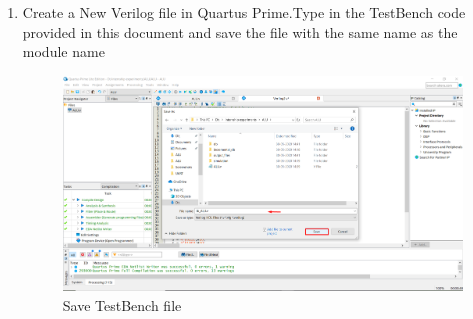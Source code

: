 \documentclass[12pt,singleside,a4paper]{article}
\begin{document}
 \begin{enumerate}
     \item Create a New Verilog file in Quartus Prime.Type in the TestBench code provided in this document and save the file with the same name as the module name
    \begin{figure}[H]
        \centering
    \includegraphics[width=14cm,keepaspectratio]{test1.png}
    \caption{Save TestBench file}
    \end{figure}
   

\end{enumerate}
\end{document}
